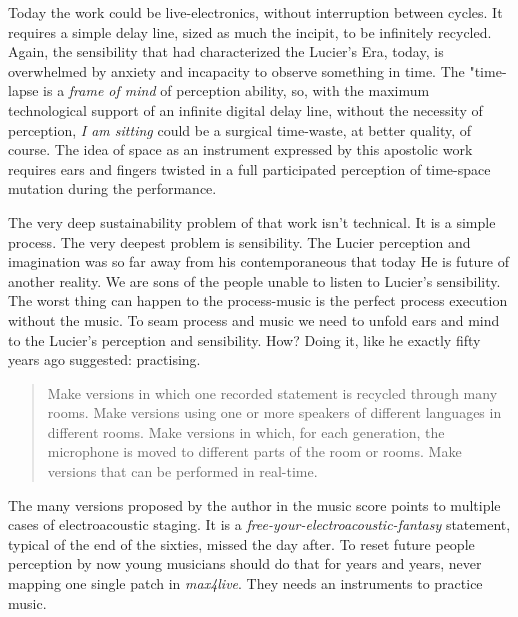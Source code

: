 \documentclass[twoside,a4paper]{article}
\begin{document}
Today the work could be live-electronics, without interruption between cycles. It requires a simple delay line, sized as much the incipit, to be infinitely recycled. Again, the sensibility that had characterized the Lucier's Era, today, is overwhelmed by anxiety and incapacity to observe something in time. The "time-lapse is a \emph{frame of mind} of perception ability, so, with the maximum technological support of an infinite digital delay line, without the necessity of perception, \emph{I am sitting} could be a surgical time-waste, at better quality, of course. The idea of space as an instrument expressed by this apostolic work requires ears and fingers twisted in a full participated perception of time-space mutation during the performance. 


The very deep sustainability problem of that work isn't technical. It is a simple process. The very deepest problem is sensibility. The Lucier perception and imagination was so far away from his contemporaneous that today He is future of another reality. We are sons of the people unable to listen to Lucier's sensibility. The worst thing can happen to the process-music is the perfect process execution without the music. To seam process and music we need to unfold ears and mind to the Lucier's perception and sensibility. How? Doing it, like he exactly fifty years ago suggested: practising. 

\begin{quote}
Make versions in which one recorded statement is recycled through many rooms. Make versions using one or more speakers of different languages in different rooms. Make versions in which, for each generation, the microphone is moved to different parts of the room or rooms. Make versions that can be performed in real-time. 
\end{quote}

The many versions proposed by the author in the music score points to multiple cases of electroacoustic staging. It is a \emph{free-your-electroacoustic-fantasy} statement, typical of the end of the sixties, missed the day after. To reset future people perception by now young musicians should do that for years and years, never mapping one single patch in \emph{max4live}. They needs an instruments to practice music. 
\end{document}
